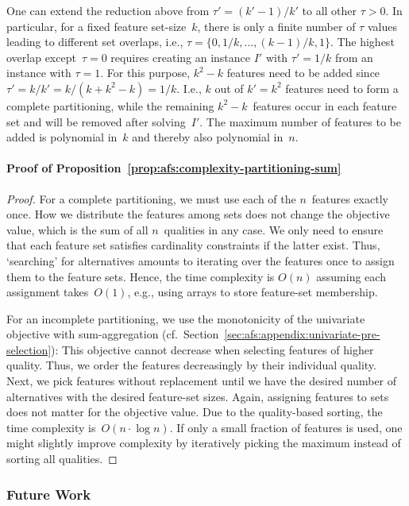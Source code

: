 \documentclass{article}
\theoremstyle{definition}
\begin{document}
One can extend the reduction above from $\tau' = (k' - 1) / k'$ to all other $\tau > 0$.
In particular, for a fixed feature set-size~$k$, there is only a finite number of $\tau$ values leading to different set overlaps, i.e., $\tau = \{0, 1/k, \dots, (k - 1) / k, 1\}$.
The highest overlap except~$\tau=0$ requires creating an instance $I'$ with $\tau'= 1/k$ from an instance with $\tau = 1$.
For this purpose, $k^2 - k$ features need to be added since $\tau' = k / k' = k / (k + k^2 -k) = 1/k$.
I.e., $k$ out of $k' = k^2$ features need to form a complete partitioning, while the remaining $k^2 - k$~features occur in each feature set and will be removed after solving~$I'$.
The maximum number of features to be added is polynomial in~$k$ and thereby also polynomial in~$n$.

\paragraph{Proof of Proposition~\ref{prop:afs:complexity-partitioning-sum}}
%
\begin{proof}
For a complete partitioning, we must use each of the $n$~features exactly once.
How we distribute the features among sets does not change the objective value, which is the sum of all $n$~qualities in any case.
We only need to ensure that each feature set satisfies cardinality constraints if the latter exist.
Thus, `searching' for alternatives amounts to iterating over the features once to assign them to the feature sets.
Hence, the time complexity is $O(n)$ assuming each assignment takes~$O(1)$, e.g., using arrays to store feature-set membership.

For an incomplete partitioning, we use the monotonicity of the univariate objective with sum-aggregation (cf.~Section~\ref{sec:afs:appendix:univariate-pre-selection}):
This objective cannot decrease when selecting features of higher quality.
Thus, we order the features decreasingly by their individual quality.
Next, we pick features without replacement until we have the desired number of alternatives with the desired feature-set sizes.
Again, assigning features to sets does not matter for the objective value.
Due to the quality-based sorting, the time complexity is~$O(n \cdot \log n)$.
If only a small fraction of features is used, one might slightly improve complexity by iteratively picking the maximum instead of sorting all qualities.
\end{proof}

\subsubsection{Future Work}
\label{sec:afs:appendix:complexity:future-work}
\end{document}
